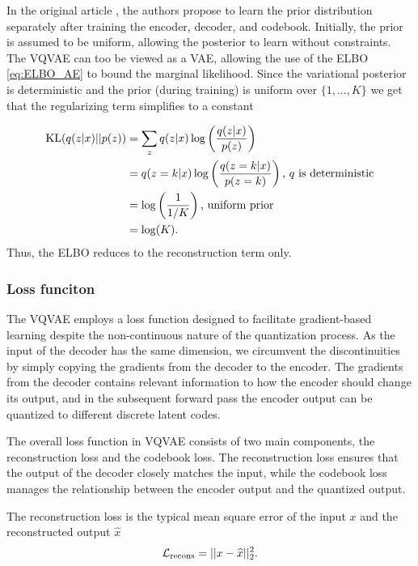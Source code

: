 \documentclass[../../thesis.tex]{subfiles}
\begin{document}
In the original article \cite{VQVAE}, the authors propose to learn the prior distribution separately after training the encoder, decoder, and codebook. Initially, the prior is assumed to be uniform, allowing the posterior to learn without constraints. The VQVAE can too be viewed as a VAE, allowing the use of the ELBO \ref{eq:ELBO_AE} to bound the marginal likelihood. Since the variational posterior is deterministic and the prior (during training) is uniform over $\{1,...,K\}$ we get that the regularizing term simplifies to a constant

\begin{equation}
    \begin{aligned}
        \operatorname*{\mathrm{KL}}(q(z|x)||p(z)) &= \sum_{z}  q(z|x) \log \left(\frac{q(z|x)}{p(z)}\right) \\
                           &= q(z=k|x) \log \left(\frac{q(z=k|x)}{p(z=k)}\right) \text{, $q$ is deterministic}\\
                           &= \log \left(\frac{1}{1/K}\right) \text{, uniform prior}\\
                           &= \log(K).
    \end{aligned}
\end{equation}
Thus, the ELBO reduces to the reconstruction term only.

\subsubsection{Loss funciton}
\label{section:VQVAELoss}
The VQVAE employs a loss function designed to facilitate gradient-based learning despite the non-continuous nature of the quantization process. As the input of the decoder has the same dimension, we circumvent the discontinuities by simply copying the gradients from the decoder to the encoder. The gradients from the decoder contains relevant information to how the encoder should change its output, and in the subsequent forward pass the encoder output can be quantized to different discrete latent codes.\newline


The overall loss function in VQVAE consists of two main components, the reconstruction loss and the codebook loss. The reconstruction loss ensures that the output of the decoder closely matches the input, while the codebook loss manages the relationship between the encoder output and the quantized output.\newline

The reconstruction loss is the typical mean square error of the input $x$ and the reconstructed output $\widehat{x}$
\begin{equation}
    \mathcal{L}_{\text{recons}} = ||x - \widehat{x}||_2^2.
\end{equation}
\end{document}
